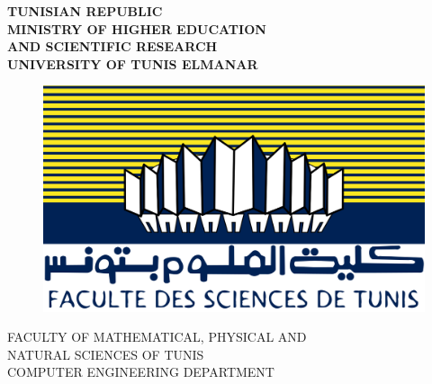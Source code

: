 \documentclass[a4paper,12pt,times,numbered,print,index]{report}
\begin{document}
\thispagestyle{empty}
\begin{center}

    \large{ { \bf TUNISIAN REPUBLIC}} \\

    \large{ { \bf MINISTRY OF HIGHER EDUCATION }} \\

    \large{ { \bf AND SCIENTIFIC RESEARCH}} \\

    \large{ { \bf UNIVERSITY OF TUNIS ELMANAR}} \\

\end{center}


\begin{figure}[htb]
    \begin{center}
        \includegraphics[scale=0.07]{figs/fst.png}
    \end{center}
\end{figure}


\begin{center}
    {  FACULTY OF MATHEMATICAL, PHYSICAL AND } \\

    {  NATURAL SCIENCES OF TUNIS } \\

    {  COMPUTER ENGINEERING DEPARTMENT } \\

\end{center}
\end{document}
